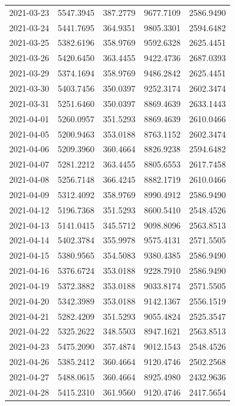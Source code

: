 \begin{footnotesize}
\begin{longtable}{lllll}
2021-03-23 & 5547.3945 & 387.2779 & 9677.7109 & 2586.9490 \\
2021-03-24 & 5441.7695 & 364.9351 & 9805.3301 & 2594.6482 \\
2021-03-25 & 5382.6196 & 358.9769 & 9592.6328 & 2625.4451 \\
2021-03-26 & 5420.6450 & 363.4455 & 9422.4736 & 2687.0393 \\
2021-03-29 & 5374.1694 & 358.9769 & 9486.2842 & 2625.4451 \\
2021-03-30 & 5403.7456 & 350.0397 & 9252.3174 & 2602.3474 \\
2021-03-31 & 5251.6460 & 350.0397 & 8869.4639 & 2633.1443 \\
2021-04-01 & 5260.0957 & 351.5293 & 8869.4639 & 2610.0466 \\
2021-04-05 & 5200.9463 & 353.0188 & 8763.1152 & 2602.3474 \\
2021-04-06 & 5209.3960 & 360.4664 & 8826.9238 & 2594.6482 \\
2021-04-07 & 5281.2212 & 363.4455 & 8805.6553 & 2617.7458 \\
2021-04-08 & 5256.7148 & 366.4245 & 8882.1719 & 2610.0466 \\
2021-04-09 & 5312.4092 & 358.9769 & 8990.4912 & 2586.9490 \\
2021-04-12 & 5196.7368 & 351.5293 & 8600.5410 & 2548.4526 \\
2021-04-13 & 5141.0415 & 345.5712 & 9098.8096 & 2563.8513 \\
2021-04-14 & 5402.3784 & 355.9978 & 9575.4131 & 2571.5505 \\
2021-04-15 & 5380.9565 & 354.5083 & 9380.4385 & 2586.9490 \\
2021-04-16 & 5376.6724 & 353.0188 & 9228.7910 & 2586.9490 \\
2021-04-19 & 5372.3882 & 353.0188 & 9033.8174 & 2571.5505 \\
2021-04-20 & 5342.3989 & 353.0188 & 9142.1367 & 2556.1519 \\
2021-04-21 & 5282.4209 & 351.5293 & 9055.4824 & 2525.3547 \\
2021-04-22 & 5325.2622 & 348.5503 & 8947.1621 & 2563.8513 \\
2021-04-23 & 5475.2090 & 357.4874 & 9012.1543 & 2548.4526 \\
2021-04-26 & 5385.2412 & 360.4664 & 9120.4746 & 2502.2568 \\
2021-04-27 & 5488.0615 & 360.4664 & 8925.4980 & 2432.9636 \\
2021-04-28 & 5415.2310 & 361.9560 & 9120.4746 & 2417.5654 \\

\end{longtable}
\end{footnotesize}
